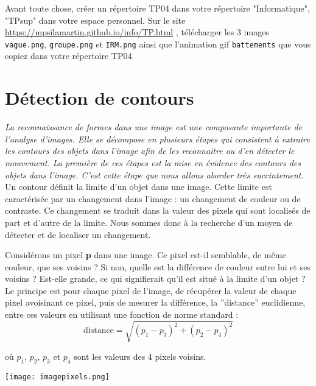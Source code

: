 
Avant toute chose, créer un répertoire TP04 dans votre répertoire "Informatique", "TPsup" dans votre espace personnel. Sur le site \url{https://mpsilamartin.github.io/info/TP.html} , télécharger les 3  images \texttt{vague.png}, \texttt{groupe.png} et \texttt{IRM.png} ainsi que l'animation gif \texttt{battements} que vous copiez dans votre répertoire TP04.



\section{Détection de contours}

\textit{La reconnaissance de formes dans une image est une composante importante de l’analyse d’images.
Elle se décompose en plusieurs étapes qui consistent à extraire les contours des objets dans l’image afin
de les reconnaitre ou d’en détecter le mouvement. La première de ces étapes est la mise en évidence
des contours des objets dans l’image. C’est cette étape que nous allons aborder très succintement.}
\\

Un contour définit la limite d’un objet dans une image. Cette limite est caractérisée par un changement
dans l'image : un changement de couleur ou de contraste. Ce changement se traduit dans la valeur des pixels qui sont localisés de part et d’autre de la limite.
Nous sommes donc à la recherche d’un moyen de détecter et de localiser un changement.\\

\begin{minipage}{.7\textwidth}%
Considérons un pixel \textbf{p} dans une image. Ce pixel est-il semblable, de même couleur, que ses voisins ? Si non, quelle est la différence de couleur entre lui et ses voisins ? Est-elle grande, ce qui signifierait qu’il est situé à la limite d’un objet ?\\
Le principe est pour chaque pixel de l'image, de récupérer la valeur de chaque pixel avoisinant ce pixel, puis de mesurer la différence, la ”distance” euclidienne, entre ces valeurs en utilisant une fonction de norme standard :
\begin{equation}
\text{distance} =\sqrt{(p_1-p_3)^2+(p_2-p_4)^2}
\end{equation} 

 où $ p_1$, $p_2$, $ p_3$ et $ p_4$ sont les valeurs des 4 pixels voisins.
 
\end{minipage}\hfill
\begin{minipage}{.25\textwidth}%
\texttt{[image: imagepixels.png]}
\end{minipage}






